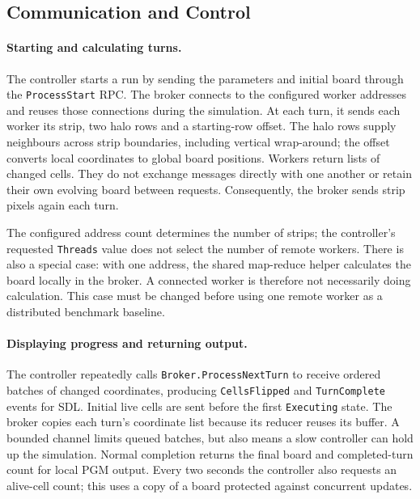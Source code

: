 \documentclass[10pt,a4paper,twocolumn]{article}
\begin{document}
\subsection{Communication and Control}

\paragraph{Starting and calculating turns.}
The controller starts a run by sending the parameters and initial board
through the \texttt{ProcessStart} RPC. The broker connects to the configured worker
addresses and reuses those connections during the simulation. At each turn,
it sends each worker its strip, two halo rows and a starting-row offset.
The halo rows supply neighbours across strip boundaries, including vertical
wrap-around; the offset converts local coordinates to global board positions.
Workers return lists of changed cells. They do not exchange messages directly
with one another or retain their own evolving board between requests.
Consequently, the broker sends strip pixels again each turn.

The configured address count determines the number of strips; the
controller's requested \texttt{Threads} value does not select the number of
remote workers. There is also a special case: with one address, the shared
map-reduce helper calculates the board locally in the broker. A connected
worker is therefore not necessarily doing calculation. This case must be
changed before using one remote worker as a distributed benchmark baseline.

\paragraph{Displaying progress and returning output.}
The controller repeatedly calls \texttt{Broker.ProcessNextTurn} to receive
ordered batches of changed coordinates, producing \texttt{CellsFlipped}
and \texttt{TurnComplete} events for SDL. Initial live cells are sent before
the first \texttt{Executing} state. The broker copies each turn's coordinate
list because its reducer reuses its buffer. A bounded channel limits queued
batches, but also means a slow controller can hold up the simulation.
Normal completion returns the final board and completed-turn count for
local PGM output. Every two seconds the controller also requests an alive-cell
count; this uses a copy of a board protected against concurrent updates.
\end{document}
